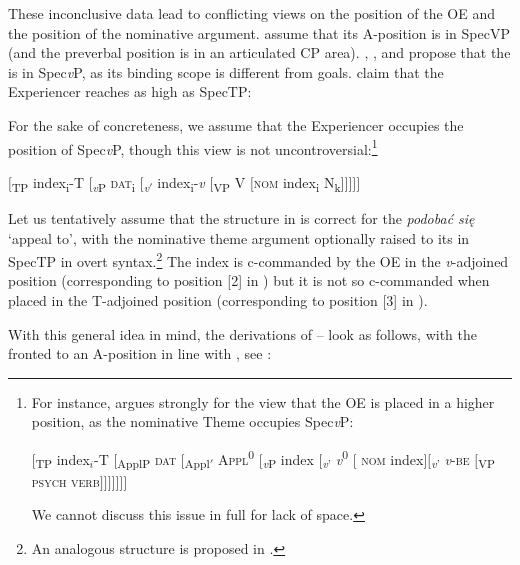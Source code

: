 \documentclass[output=paper,nonflat,colorlinks,citecolor=brown,newtxmath]{langsci/langscibook}
\begin{document}
These inconclusive data lead to conflicting views on the position of the  OE and the position of the nominative argument. \cite{jimenezfernandez2016} assume that its A-position is in SpecVP (and the preverbal position is in an articulated CP area). \citet{bondaruk2007}, \citet{tajsner2008}, and \citet{bondaruketal2017} propose that the   is in Spec\textit{v}P, as its binding scope is different from  goals. \cite{miechowicz2008} claim that the  Experiencer reaches as high as SpecTP:

For the sake of concreteness, we assume that the  Experiencer occupies the position of Spec\textit{v}P, though this view is not uncontroversial:\footnote{\label{fn25}For instance, \cite{cuervo2003} argues strongly for the view that the  OE is placed in a higher position, as the nominative Theme occupies Spec\textit{v}P:

\ea
$[$\textsubscript{TP} index$_i$-T $[$\textsubscript{ApplP} \textsc{dat} $[$\textsubscript{Appl$'$}  \textsc{Appl}\textsuperscript{0} $[$\textsubscript{\textit{v}P} index $[$\textsubscript{\textit{v}$’$} \textit{v}\textsuperscript{0} $[$ \textsc{nom} index$][$\textsubscript{\textit{v}’} \textit{v}-\textsc{be} $[$\textsubscript{VP} \textsc{psych verb}$]]]]]]]$
\z

\noindent We cannot discuss this issue in full for lack of space.}

\ea \label{ex:witkos:49}
$[$\textsubscript{TP} index\textsubscript{i}-T $[$\textsubscript{\textit{v}P}  \textsc{dat}\textsubscript{i} $[$\textsubscript{\textit{v}$'$} index\textsubscript{i}-\textit{v} $[$\textsubscript{VP} V $[$\textsc{nom} index\textsubscript{i} N\textsubscript{k}$]]]]]$\\
\z

\noindent Let us tentatively assume that the structure in  is correct for the  \textit{podobać się} `appeal to', with the nominative theme argument optionally raised to its  in SpecTP in overt syntax.\footnote{\label{fn26}An analogous structure is proposed in \cite{klimek2004}.} The index is c-commanded by the  OE in the \textit{v}-adjoined position (corresponding to position [2] in ) but it is not so c-commanded when placed in the T-adjoined position (corresponding to position [3] in ).

With this general idea in mind, the derivations of -- look as follows, with the   fronted to an A-position in line with \cite{germain2015}, see :
\end{document}
